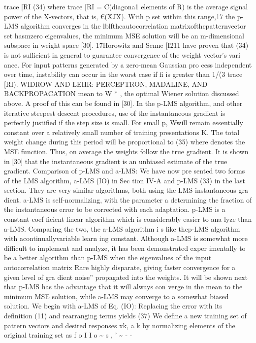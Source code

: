 \documentclass[11pt,a4paper,twocolumn]{article}
\begin{document}
{trace [RI 
(34) 
where trace [RI = C(diagona1 elements of R) is the average 
signal power of the X-vectors, that is, €(XJX). With p set 
within this range,17 the p-LMS algorithm converges in the 
lblftheautocorrelation matrixofthepatternvector set hasmzero 
eigenvalues, the minimum MSE solution will be an m-dimensional 
subspace in weight space [30]. 
17Horowitz and Senne [I211 have proven that (34) is not sufficient 
in general to guarantee convergence of the weight vector’s vari
ance. For input patterns generated by a zero-mean Gaussian pro
cess independent over time, instability can occur in the worst case 
if fi is greater than 1/(3 trace [RI). 
WIDROW AND LEHR: PERCEPTRON, MADALINE, AND BACKPROPACATION 
mean to W * ,  the optimal Wiener solution discussed above. 
A proof of this can be found in [30]. 
In the p-LMS algorithm, and other iterative steepest
descent procedures, use of the instantaneous gradient is 
perfectly justified if the step size is small. For small p, Wwill 
remain essentially constant over a relatively small number 
of training presentations K. The total weight change during 
this period will be proportional to 
(35) 
where 
denotes the MSE function. Thus, on average the 
weights follow the true gradient. It is shown in [30] that the 
instantaneous gradient is an unbiased estimate of the true 
gradient. 
Comparison of p-LMS and a-LMS: We have now pre
sented two forms of the LMS algorithm, a-LMS (IO) in Sec
tion IV-A and p-LMS (33) in the last section. They are very 
similar algorithms, both using the LMS instantaneous gra
dient. a-LMS is self-normalizing, with the parameter a 
determining the fraction of the instantaneous error to be 
corrected with each adaptation. p-LMS is a constant-coef
ficient linear algorithm which is considerably easier to ana
lyze than a-LMS. Comparing the two, the a-LMS algorithm 
i s  like thep-LMS algorithm with acontinuallyvariable learn
ing constant. Although a-LMS is somewhat more difficult 
to implement and analyze, it has been demonstrated exper
imentally to be a better algorithm than p-LMS when the 
eigenvalues of the input autocorrelation matrix Rare highly 
disparate, giving faster convergence for a given level of gra
dient noise” propagated into the weights. It will be shown 
next that p-LMS has the advantage that it will always con
verge in the mean to the minimum MSE solution, while 
a-LMS may converge to a somewhat biased solution. 
We begin with a-LMS of Eq. (IO): 
Replacing the error with its definition (11) and rearranging 
terms yields 
(37) 
We define a new training set of pattern vectors and desired 
responses {xk, a k }  by normalizing elements of the original 
training set as f o I I o \~{} s , ’ \~{}  
-
-

}
\end{document}
